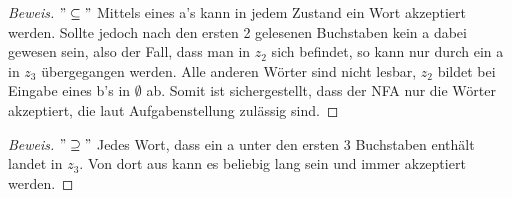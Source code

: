 \begin{proof}[Beweis] $"\subseteq"$
	Mittels eines a's kann in jedem Zustand ein Wort akzeptiert werden. Sollte jedoch nach den ersten 2 gelesenen Buchstaben kein a dabei gewesen sein, also der Fall, dass man in $z_2$ sich befindet, so kann nur durch ein a in $z_3$ übergegangen werden. Alle anderen Wörter sind nicht lesbar, $z_2$ bildet bei Eingabe eines b's in $\emptyset$ ab. Somit ist sichergestellt, dass der NFA nur die  Wörter akzeptiert, die laut Aufgabenstellung zulässig sind.
\end{proof}
\begin{proof}[Beweis] $"\supseteq"$
	Jedes Wort, dass ein a unter den ersten 3 Buchstaben enthält landet in $z_3$. Von dort aus kann es beliebig lang sein und immer akzeptiert werden.
\end{proof}